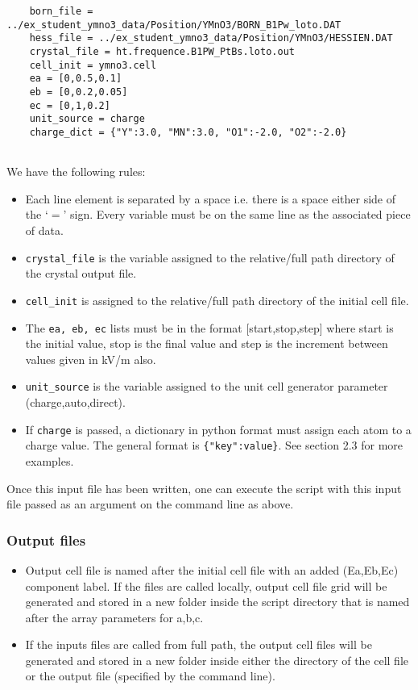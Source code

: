 \begin{lstlisting}
	born_file = ../ex_student_ymno3_data/Position/YMnO3/BORN_B1Pw_loto.DAT
	hess_file = ../ex_student_ymno3_data/Position/YMnO3/HESSIEN.DAT
	crystal_file = ht.frequence.B1PW_PtBs.loto.out
	cell_init = ymno3.cell
	ea = [0,0.5,0.1]
	eb = [0,0.2,0.05]
	ec = [0,1,0.2]
	unit_source = charge
	charge_dict = {"Y":3.0, "MN":3.0, "O1":-2.0, "O2":-2.0}
	
\end{lstlisting}

We have the following rules:

\begin{itemize}
	\item Each line element is separated by a space i.e. there is a space either side of the `$=$' sign. Every variable must be on the same line as the associated piece of data.
	
	\item \texttt{crystal\_file} is the variable assigned to the relative/full path directory of the crystal output file.
	
	\item \texttt{cell\_init} is assigned to the relative/full path directory of the initial cell file.
	
	\item The \texttt{ea, eb, ec} lists must be in the format [start,stop,step] where start is the initial value, stop is the final value and step is the increment between values given in kV/m also.
	
	\item \texttt{unit\_source} is the variable assigned to the unit cell generator parameter (charge,auto,direct).
	
	\item If \texttt{charge} is passed, a dictionary in python format must assign each atom to a charge value. The general format is \texttt{\{"key":value\}}. See section 2.3 for more examples.
	
\end{itemize}

Once this input file has been written, one can execute the script with this input file passed as an argument on the command line as above. 

\subsubsection{Output files}

\begin{itemize}
	\item Output cell file is named after the initial cell file with an added (Ea,Eb,Ec) component label. If the files are called locally, output cell file grid will be generated and stored in a new folder inside the script directory that is named after the array parameters for a,b,c.
	\item If the inputs files are called from full path, the output cell files will be generated and stored in a new folder inside either the directory of the cell file or the output file (specified by the command line).
\end{itemize}





